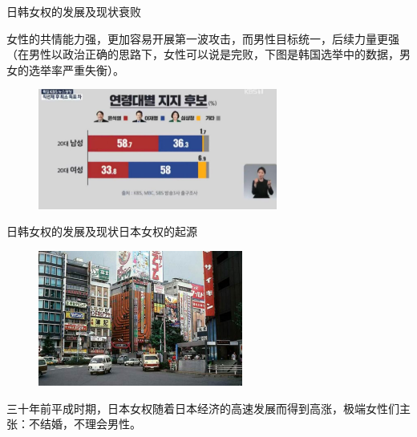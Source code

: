 \documentclass{beamer}
\begin{document}
	\begin{frame}{日韩女权的发展及现状}{衰败}
		
		女性的共情能力强，更加容易开展第一波攻击，而男性目标统一，后续力量更强（在男性以政治正确的思路下，女性可以说是完败，下图是韩国选举中的数据，男女的选举率严重失衡）。
		\begin{figure}
			\centering
			\includegraphics[width=0.7\textwidth]{img/图片19.png}
		\end{figure}
	\end{frame}

	\begin{frame}{日韩女权的发展及现状}{日本女权的起源}
		\begin{figure}
			\centering
			\includegraphics[width=0.6\textwidth]{img/图片20.png}
		\end{figure}
		三十年前平成时期，日本女权随着日本经济的高速发展而得到高涨，极端女性们主张：不结婚，不理会男性。
	\end{frame}
\end{document}
